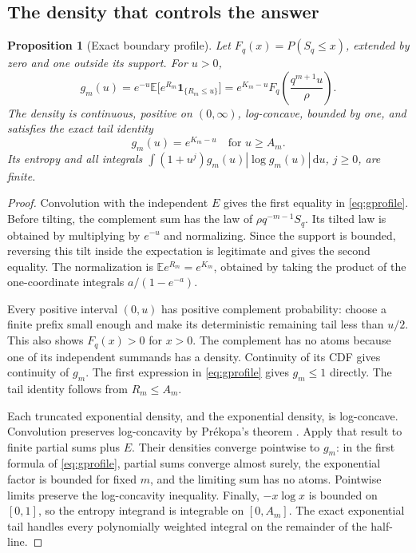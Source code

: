 \documentclass[11pt,a4paper]{article}
\numberwithin{equation}{section}
\newtheorem{proposition}[theorem]{Proposition}
\theoremstyle{definition}
\theoremstyle{remark}
\newcommand{\E}{\mathbb E}
\newcommand{\ind}{\mathbf 1}
\newcommand{\dd}{\mathrm d}
\begin{document}
\subsection{The density that controls the answer}
\begin{proposition}[Exact boundary profile]\label{prop:profile}
Let $F_q(x)=P(S_q\le x)$, extended by zero and one outside its support.
For $u>0$,
\begin{equation}\label{eq:gprofile}
g_m(u)=e^{-u}\E\bigl[e^{R_m}\ind_{\{R_m\le u\}}\bigr]
      =e^{K_m-u}F_q\!\left(\frac{q^{m+1}u}{\rho}\right).
\end{equation}
The density is continuous, positive on $(0,\infty)$, log-concave, bounded
by one, and satisfies the exact tail identity
\begin{equation}\label{eq:tail}
g_m(u)=e^{K_m-u}\quad\text{for }u\ge A_m.
\end{equation}
Its entropy and all integrals
$\int(1+u^j)g_m(u)|\log g_m(u)|\,\dd u$, $j\ge0$, are finite.
\end{proposition}
\begin{proof}
Convolution with the independent $E$ gives the first equality in
\eqref{eq:gprofile}. Before tilting, the complement sum has the law of
$\rho q^{-m-1}S_q$. Its tilted law is obtained by multiplying by $e^{-u}$
and normalizing. Since the support is bounded, reversing this tilt
inside the expectation is legitimate and gives the second equality.
The normalization is $\E e^{R_m}=e^{K_m}$, obtained by taking the product
of the one-coordinate integrals $a/(1-e^{-a})$.

Every positive interval $(0,u)$ has positive complement probability:
choose a finite prefix small enough and make its deterministic remaining
tail less than $u/2$. This also shows $F_q(x)>0$ for $x>0$. The complement
has no atoms because one of its independent summands has a density.
Continuity of its CDF gives continuity of $g_m$. The first expression in
\eqref{eq:gprofile} gives $g_m\le1$ directly. The tail identity follows
from $R_m\le A_m$.

Each truncated exponential density, and the exponential density, is
log-concave. Convolution preserves log-concavity by Pr\'ekopa's theorem
\cite[Theorem~7]{prekopa}. Apply that result to finite partial sums plus
$E$. Their densities converge pointwise to $g_m$: in the first formula
of \eqref{eq:gprofile}, partial sums converge almost surely, the
exponential factor is bounded for fixed $m$, and the limiting sum has
no atoms. Pointwise limits preserve the log-concavity inequality.
Finally, $-x\log x$ is bounded on $[0,1]$, so the entropy integrand is
integrable on $[0,A_m]$. The exact exponential tail handles every
polynomially weighted integral on the remainder of the half-line.
\end{proof}
\end{document}
